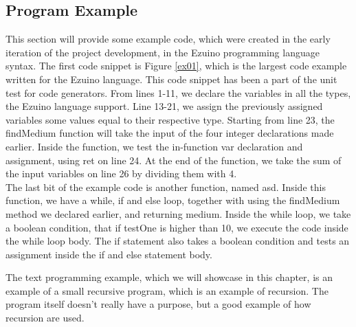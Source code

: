 \subsection{Program Example}
This section will provide some example code, which were created in the early iteration of the project development, in the Ezuino programming language syntax. The first code snippet is Figure \ref{ex01}, which is the largest code example written for the Ezuino language. This code snippet has been a part of the unit test for code generators. From lines 1-11, we declare the variables in all the types, the Ezuino language support. Line 13-21, we assign the previously assigned variables some values equal to their respective type. Starting from line 23, the findMedium function will take the input of the four integer declarations made earlier. Inside the function, we test the in-function var declaration and assignment, using ret on line 24. At the end of the function, we take the sum of the input variables on line 26 by dividing them with 4. \\
The last bit of the example code is another function, named asd. Inside this function, we have a while, if and else loop, together with using the findMedium method we declared earlier, and returning medium. Inside the while loop, we take a boolean condition, that if testOne is higher than 10, we execute the code inside the while loop body. The if statement also takes a boolean condition and tests an assignment inside the if and else statement body.

\noindent\newline
The text programming example, which we will showcase in this chapter, is an example of a small recursive program, which is an example of recursion. The program itself doesn’t really have a purpose, but a good example of how recursion are used.

\noindent\newline